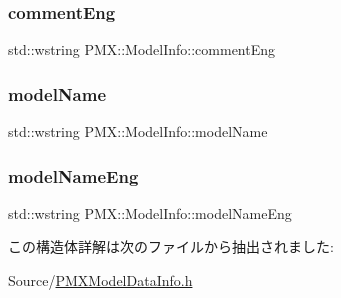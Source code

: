 \subsubsection{\texorpdfstring{comment\+Eng}{commentEng}}
{\footnotesize\ttfamily std\+::wstring P\+M\+X\+::\+Model\+Info\+::comment\+Eng}

\mbox{\label{struct_p_m_x_1_1_model_info_aef4b5c31db4a895d72c82d8e9f762037}} 
\subsubsection{\texorpdfstring{model\+Name}{modelName}}
{\footnotesize\ttfamily std\+::wstring P\+M\+X\+::\+Model\+Info\+::model\+Name}

\mbox{\label{struct_p_m_x_1_1_model_info_a39f11c83c092fe840ceef5ce466c003f}} 
\subsubsection{\texorpdfstring{model\+Name\+Eng}{modelNameEng}}
{\footnotesize\ttfamily std\+::wstring P\+M\+X\+::\+Model\+Info\+::model\+Name\+Eng}



この構造体詳解は次のファイルから抽出されました\+:\begin{DoxyCompactItemize}
\item 
Source/\mbox{\hyperlink{_p_m_x_model_data_info_8h}{P\+M\+X\+Model\+Data\+Info.\+h}}\end{DoxyCompactItemize}
